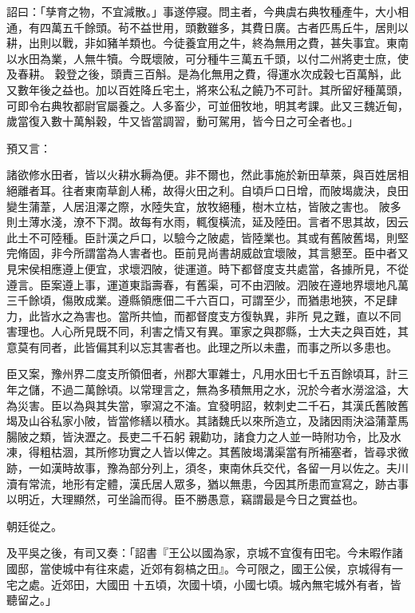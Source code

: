 \begin{pinyinscope}
 詔曰：「孳育之物，不宜減散。」事遂停寢。問主者，今典虞右典牧種產牛，大小相通，有四萬五千餘頭。茍不益世用，頭數雖多，其費日廣。古者匹馬丘牛，居則以耕，出則以戰，非如豬羊類也。今徒養宜用之牛，終為無用之費，甚失事宜。東南以水田為業，人無牛犢。今既壞陂，可分種牛三萬五千頭，以付二州將吏士庶，使及春耕。
 穀登之後，頭責三百斛。是為化無用之費，得運水次成穀七百萬斛，此又數年後之益也。加以百姓降丘宅土，將來公私之饒乃不可計。其所留好種萬頭，可即令右典牧都尉官屬養之。人多畜少，可並佃牧地，明其考課。此又三魏近甸，歲當復入數十萬斛穀，牛又皆當調習，動可駕用，皆今日之可全者也。」



 預又言：



 諸欲修水田者，皆以火耕水耨為便。非不爾也，然此事施於新田草萊，與百姓居相絕離者耳。往者東南草創人稀，故得火田之利。自頃戶口日增，而陂堨歲決，良田變生蒲葦，人居沮澤之際，水陸失宜，放牧絕種，樹木立枯，皆陂之害也。
 陂多則土薄水淺，潦不下潤。故每有水雨，輒復橫流，延及陸田。言者不思其故，因云此土不可陸種。臣計漢之戶口，以驗今之陂處，皆陸業也。其或有舊陂舊堨，則堅完脩固，非今所謂當為人害者也。臣前見尚書胡威啟宜壞陂，其言懇至。臣中者又見宋侯相應遵上便宜，求壞泗陂，徙運道。時下都督度支共處當，各據所見，不從遵言。臣案遵上事，運道東詣壽春，有舊渠，可不由泗陂。泗陂在遵地界壞地凡萬三千餘頃，傷敗成業。遵縣領應佃二千六百口，可謂至少，而猶患地狹，不足肆力，此皆水之為害也。當所共恤，而都督度支方復執異，非所
 見之難，直以不同害理也。人心所見既不同，利害之情又有異。軍家之與郡縣，士大夫之與百姓，其意莫有同者，此皆偏其利以忘其害者也。此理之所以未盡，而事之所以多患也。



 臣又案，豫州界二度支所領佃者，州郡大軍雜士，凡用水田七千五百餘頃耳，計三年之儲，不過二萬餘頃。以常理言之，無為多積無用之水，況於今者水澇湓溢，大為災害。臣以為與其失當，寧瀉之不滀。宜發明詔，敕刺史二千石，其漢氏舊陂舊堨及山谷私家小陂，皆當修繕以積水。其諸魏氏以來所造立，及諸因雨決溢蒲葦馬腸陂之類，皆決瀝之。長吏二千石躬
 親勸功，諸食力之人並一時附功令，比及水凍，得粗枯涸，其所修功實之人皆以俾之。其舊陂堨溝渠當有所補塞者，皆尋求微跡，一如漢時故事，豫為部分列上，須冬，東南休兵交代，各留一月以佐之。夫川瀆有常流，地形有定體，漢氏居人眾多，猶以無患，今因其所患而宣寫之，跡古事以明近，大理顯然，可坐論而得。臣不勝愚意，竊謂最是今日之實益也。



 朝廷從之。



 及平吳之後，有司又奏：「詔書『王公以國為家，京城不宜復有田宅。今未暇作諸國邸，當使城中有往來處，近郊有芻槁之田』。今可限之，國王公侯，京城得有一宅之處。近郊田，大國田
 十五頃，次國十頃，小國七頃。城內無宅城外有者，皆聽留之。」




\end{pinyinscope}
